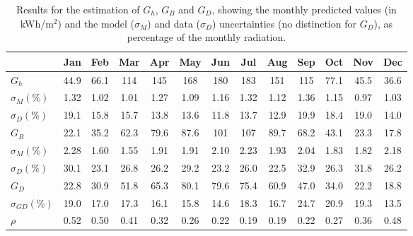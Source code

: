 \begin{table}[tb]
\centering
\footnotesize
\caption{Results for the estimation of $G_h$, $G_B$ and $G_D$, showing the monthly predicted values (in kWh/m$^2$) and the model ($\sigma_M$) and data ($\sigma_D$) uncertainties (no distinction for $G_D$), as percentage of the monthly radiation.}
\label{tab:G_results}
\begin{tabular}{lcccccccccccc} %
\hline 
      & \textbf{Jan}  & \textbf{Feb}  & \textbf{Mar}   & \textbf{Apr}   & \textbf{May}   & \textbf{Jun}   & \textbf{Jul}   & \textbf{Aug}   & \textbf{Sep}   & \textbf{Oct}  & \textbf{Nov}  & \textbf{Dec}  \\
\hline 
$G_h$ & 44.9 & 66.1 & 114 & 145 & 168 & 180 & 183 & 151 & 115 & 77.1 & 45.5 & 36.6 \\
$\sigma_{M} (\%)\ $ & 1.32 & 1.02 & 1.01  & 1.27  & 1.09  & 1.16  & 1.32  & 1.12  & 1.36  & 1.15 & 0.97 & 1.03 \\
$\sigma_{D} (\%)\ $  & 19.1 & 15.8 & 15.7  & 13.8  & 13.6  & 11.8  & 13.7  & 12.9  & 19.9  & 18.4 & 19.0 & 14.0 \\
\hline 
$G_B$ & 22.1 & 35.2 & 62.3 & 79.6 & 87.6 & 101 & 107 & 89.7 & 68.2 & 43.1 & 23.3 & 17.8 \\
$\sigma_{M} (\%)\ $ & 2.28 & 1.60 & 1.55 & 1.91 & 1.91 & 2.10  & 2.23  & 1.93 & 2.04 & 1.83 & 1.82 & 2.18 \\
$\sigma_{D} (\%)\ $  & 30.1 & 23.1 & 26.8 & 26.2 & 29.2 & 23.2  & 26.0  & 22.5 & 32.9 & 26.3 & 31.8 & 26.2 \\
\hline 
$G_D$ & 22.8 & 30.9 & 51.8 & 65.3 & 80.1 & 79.6 & 75.4 & 60.9 & 47.0 & 34.0 & 22.2 & 18.8 \\
$\sigma_{GD} (\%)$ & 19.0 & 17.0 & 17.3 & 16.1 & 15.8 & 14.6  & 18.3  & 16.7  & 24.7  & 20.9 & 19.3 & 13.5 \\
\hline
$\rho$ & 0.52 & 0.50 & 0.41 & 0.32 & 0.26 & 0.22 & 0.19 & 0.19 & 0.22 & 0.27 & 0.36 & 0.48 \\
\hline
\end{tabular}
\end{table}

